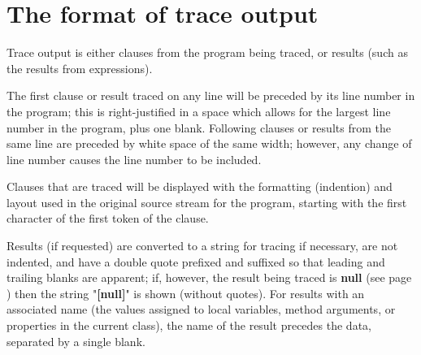 \section{The format of trace output}
 
Trace output is either clauses from the program being traced, or results
(such as the results from expressions).
 
The first clause or result traced on any line will be preceded by its
line number in the program; this is right-justified in a space which
allows for the largest line number in the program, plus one blank.
Following clauses or results from the same line are preceded by white
space of the same width; however, any change of line number causes the
line number to be included.
 
Clauses that are traced will be displayed with the formatting
(indention) and layout used in the original source stream for the
program, starting with the first character of the first token of the
clause.
 
Results (if requested) are converted to a string for tracing if
necessary, are not indented, and have a double quote prefixed and
suffixed so that leading and trailing blanks are apparent; if, however,
the result being traced is  \textbf{null} (see page \pageref{refswnull})  then the
string "\textbf{[null]}" is shown (without quotes).
For results with an associated name (the values assigned to local
variables, method arguments, or properties in the current class), the
name of the result precedes the data, separated by a single blank.
 

